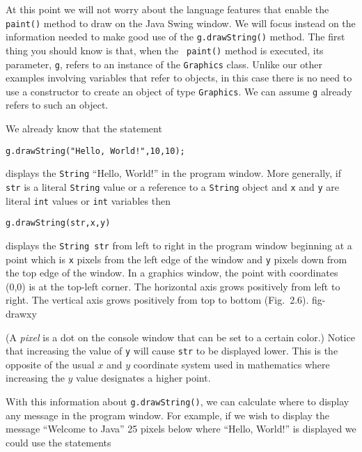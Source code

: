 At this point we will not worry about the language features that
enable the {\tt paint()} method to draw on the Java Swing window.  
We will focus instead on the
information needed to make good use of the {\tt g.drawString()}
method.  The first thing you should know is that, when the {\tt
paint()} method is executed, its parameter, {\tt g}, refers to an
instance of the {\tt Graphics} class. Unlike our other examples
involving variables that refer to objects, in this case there is no need to use a
constructor to create an object of type {\tt Graphics}. We can assume
{\tt g} already refers to such an object.

We already know that the statement

\begin{jjjlisting}
\begin{lstlisting} 
g.drawString("Hello, World!",10,10);   
\end{lstlisting}
\end{jjjlisting}

\noindent displays the {\tt String} ``Hello, World!'' in the program window.  More
generally, if {\tt str} is a literal {\tt String} value or a reference
to a {\tt String} object and {\tt x} and {\tt y} are literal {\tt int}
values or {\tt int} variables then

\begin{jjjlisting}
\begin{lstlisting}  
g.drawString(str,x,y) 
\end{lstlisting}
\end{jjjlisting}

\noindent displays the {\tt String str} from left to right in the program window
beginning at a point which is {\tt x} pixels from the left edge of the
window and {\tt y} pixels down from the top edge of the window. In a
graphics window, the point with coordinates (0,0) is at the top-left
corner. The horizontal axis grows positively from left to right. The
vertical axis grows positively from top to bottom (Fig.~2.6). 
{fig-drawxy}

(A {\em pixel} is a dot on the console window that can be set to a
certain color.)  Notice that increasing the value of {\tt y} will
cause {\tt str} to be displayed lower. This is the opposite of the
usual $x$ and $y$ coordinate system used in mathematics where
increasing the $y$ value designates a higher point.  

With this information about {\tt g.drawString()}, we can calculate
where to display any message in the program window.  For example, if we
wish to display the message ``Welcome to Java'' 25 pixels below where
``Hello, World!'' is displayed we could use the statements

